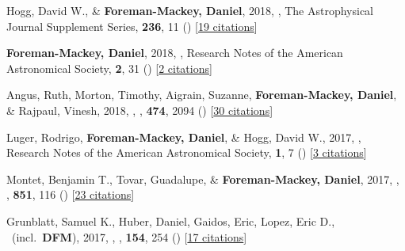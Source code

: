 \item[{\color{numcolor}\scriptsize34}] Hogg, David W., \& \textbf{Foreman-Mackey, Daniel}, 2018, , The Astrophysical Journal Supplement Series, \textbf{236}, 11 () [\href{http://adsabs.harvard.edu/abs/2018ApJS..236...11H}{19 citations}]

\item[{\color{numcolor}\scriptsize33}] \textbf{Foreman-Mackey, Daniel}, 2018, , Research Notes of the American Astronomical Society, \textbf{2}, 31 () [\href{http://adsabs.harvard.edu/abs/2018RNAAS...2a..31F}{2 citations}]

\item[{\color{numcolor}\scriptsize32}] Angus, Ruth, Morton, Timothy, Aigrain, Suzanne, \textbf{Foreman-Mackey, Daniel}, \& Rajpaul, Vinesh, 2018, , \mnras, \textbf{474}, 2094 () [\href{http://adsabs.harvard.edu/abs/2018MNRAS.474.2094A}{30 citations}]

\item[{\color{numcolor}\scriptsize31}] Luger, Rodrigo, \textbf{Foreman-Mackey, Daniel}, \& Hogg, David W., 2017, , Research Notes of the American Astronomical Society, \textbf{1}, 7 () [\href{http://adsabs.harvard.edu/abs/2017RNAAS...1a...7L}{3 citations}]

\item[{\color{numcolor}\scriptsize30}] Montet, Benjamin T., Tovar, Guadalupe, \& \textbf{Foreman-Mackey, Daniel}, 2017, , \apj, \textbf{851}, 116 () [\href{http://adsabs.harvard.edu/abs/2017ApJ...851..116M}{23 citations}]

\item[{\color{numcolor}\scriptsize29}] Grunblatt, Samuel K., Huber, Daniel, Gaidos, Eric, Lopez, Eric D., \etal\ (incl.\ \textbf{DFM}), 2017, , \aj, \textbf{154}, 254 () [\href{http://adsabs.harvard.edu/abs/2017AJ....154..254G}{17 citations}]

